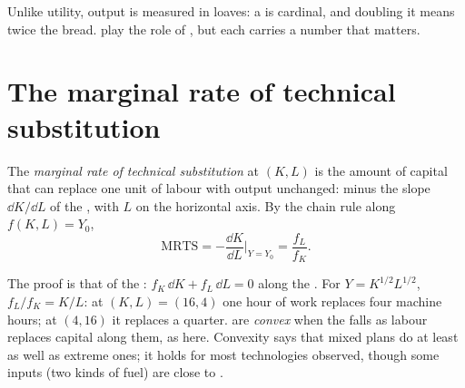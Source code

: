 Unlike utility, output is measured in loaves: a  is
cardinal, and doubling it means twice the bread.  play the role of
, but each carries a number that matters.

\section{The marginal rate of technical substitution}\label{sec:b1:technology:mrts}

\begin{definition}\label{def:b1:technology:mrts}
The \emph{marginal rate of technical substitution} at $(K, L)$ is the amount
of capital that can replace one unit of labour with output unchanged:
minus the slope $\dd K/\dd L$ of the , with $L$ on the horizontal
axis. By the chain rule along $f(K, L) = Y_0$,
\[
\mathrm{MRTS} = -\frac{\dd K}{\dd L}\bigg|_{Y = Y_0} = \frac{f_L}{f_K}.
\]
\end{definition}

The proof is that of the :
$f_K\,\dd K + f_L\,\dd L = 0$ along the . For $Y = K^{1/2}L^{1/2}$,
$f_L/f_K = K/L$: at $(K, L) = (16, 4)$ one hour of work replaces four machine
hours; at $(4, 16)$ it replaces a quarter.  are \emph{convex} when
the  falls as labour replaces capital along them, as here. Convexity
says that mixed plans do at least as well as extreme ones; it holds for
most technologies observed, though some inputs (two kinds of fuel) are
close to .

